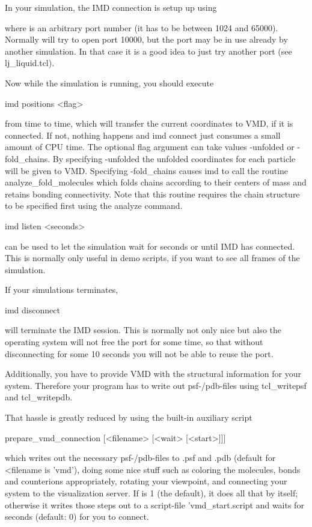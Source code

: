 In your simulation, the IMD connection is setup up using 

where  is an arbitrary port number (it has to be between
1024 and 65000). Normally \es{} will try to open port 10000, but the
port may be in use already by another \es{} simulation. In that case
it is a good idea to just try another port (see lj\_liquid.tcl).

Now while the simulation is running, you should execute
\begin{code}
imd positions <flag>
\end{code}
from time to time, which will transfer the current coordinates to VMD,
if it is connected. If not, nothing happens and imd connect just
consumes a small amount of CPU time. The optional flag argument can
take values -unfolded or -fold\_chains. By specifying -unfolded the
unfolded coordinates for each particle will be given to VMD.
Specifying -fold\_chains causes imd to call the routine
analyze\_fold\_molecules which folds chains according to their centers
of mass and retains bonding connectivity. Note that this routine
requires the chain structure to be specified first using the analyze
command.
\begin{code}
imd listen <seconds>
\end{code}
can be used to let the simulation wait for  seconds or
until IMD has connected. This is normally only useful in demo scripts,
if you want to see all frames of the simulation.

If your simulations terminates,
\begin{code}
imd disconnect
\end{code}

will terminate the IMD session. This is normally not only nice but
also the operating system will not free the port for some time, so
that without disconnecting for some 10 seconds you will not be able to
reuse the port.

Additionally, you have to provide VMD with the structural information
for your system. Therefore your program has to write out
psf-/pdb-files using tcl\_writepsf and tcl\_writepdb.

That hassle is greatly reduced by using the built-in auxiliary script
\begin{code}
prepare\_vmd\_connection [<filename> [<wait> [<start>]]]
\end{code}

which writes out the necessary psf-/pdb-files to .psf
and .pdb (default for <filename is 'vmd'), doing some
nice stuff such as coloring the molecules, bonds and counterions
appropriately, rotating your viewpoint, and connecting your system to
the visualization server. If  is 1 (the default), it does
all that by itself; otherwise it writes those steps out to a
script-file 'vmd\_start.script and waits for  seconds
(default: 0) for you to connect.

